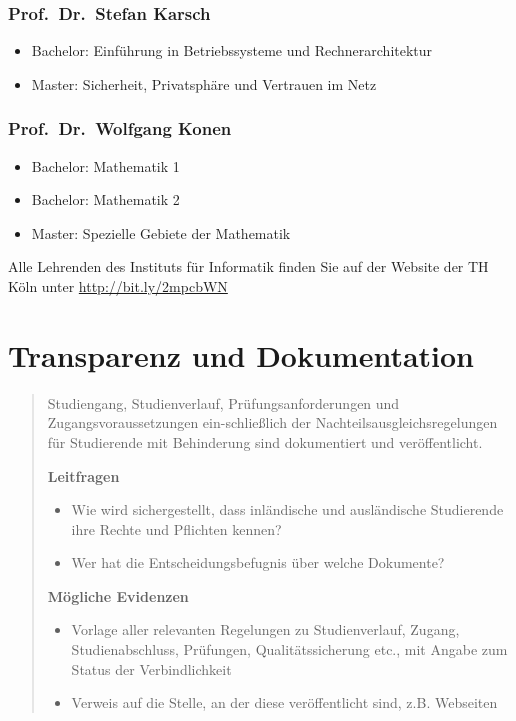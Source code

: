 \subsection{Prof.~Dr.~Stefan Karsch}\label{prof.dr.stefan-karsch}

\begin{itemize}
\tightlist
\item
  Bachelor: Einführung in Betriebssysteme und Rechnerarchitektur
\item
  Master: Sicherheit, Privatsphäre und Vertrauen im Netz
\end{itemize}

\subsection{Prof.~Dr.~Wolfgang Konen}\label{prof.dr.wolfgang-konen}

\begin{itemize}
\tightlist
\item
  Bachelor: Mathematik 1
\item
  Bachelor: Mathematik 2
\item
  Master: Spezielle Gebiete der Mathematik
\end{itemize}

Alle Lehrenden des Instituts für Informatik finden Sie auf der Website
der TH Köln unter \href{http://bit.ly/2mbFEYc}{http://bit.ly/2mpcbWN}

\chapter{Transparenz und
Dokumentation}\label{transparenz-und-dokumentation}

\begin{quote}
Studiengang, Studienverlauf, Prüfungsanforderungen und
Zugangsvoraussetzungen ein-schließlich der Nachteilsausgleichsregelungen
für Studierende mit Behinderung sind dokumentiert und veröffentlicht.

\textbf{Leitfragen}

\begin{itemize}
\item
  Wie wird sichergestellt, dass inländische und ausländische Studierende
  ihre Rechte und Pflichten kennen?
\item
  Wer hat die Entscheidungsbefugnis über welche Dokumente?
\end{itemize}

\textbf{Mögliche Evidenzen}

\begin{itemize}
\item
  Vorlage aller relevanten Regelungen zu Studienverlauf, Zugang,
  Studienabschluss, Prüfungen, Qualitätssicherung etc., mit Angabe zum
  Status der Verbindlichkeit
\item
  Verweis auf die Stelle, an der diese veröffentlicht sind, z.B.
  Webseiten
\end{itemize}
\end{quote}

